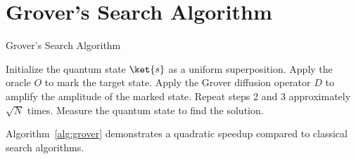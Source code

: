 \documentclass{article}
\begin{document}
\section*{Grover's Search Algorithm}

\begin{algorithm}
\caption{Grover's Search Algorithm}
\label{alg:grover}
\begin{algorithmic}[1]
\STATE Initialize the quantum state $\ket{s}$ as a uniform superposition.
\STATE Apply the oracle $O$ to mark the target state.
\STATE Apply the Grover diffusion operator $D$ to amplify the amplitude of the marked state.
\STATE Repeat steps 2 and 3 approximately $\sqrt{N}$ times.
\STATE Measure the quantum state to find the solution.
\end{algorithmic}
\end{algorithm}

Algorithm~\ref{alg:grover} demonstrates a quadratic speedup compared to classical search algorithms.
\end{document}

